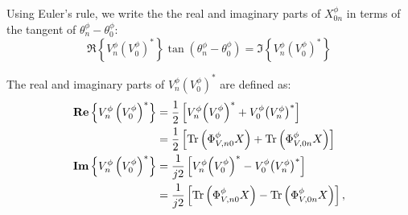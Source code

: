 
\noindent Using Euler's rule, we write the the real and imaginary parts of $X_{0n}^{\phi}$ in terms of the tangent of $\theta_{n}^{\phi} - \theta_{0}^{\phi}$:
\begin{equation}
	\Re \left\{ V_{n}^{\phi} {\left( V_{0}^{\phi} \right)}^{*} \right\} \tan \left( \theta_{n}^{\phi} - \theta_{0}^{\phi} \right)
    =
    \Im \left\{ V_{n}^{\phi} {\left( V_{0}^{\phi} \right)}^{*} \right\}
\end{equation}

\noindent The real and imaginary parts of $V_{n}^{\phi} \left( V_{0}^{\phi} \right)^{*}$ are defined as:
\begin{align}
	\operatorname{\textbf{Re}} \left\{ V_{n}^{\phi} \left( V_{0}^{\phi} \right)^{*} \right\}
    &= 
    \frac{1}{2} \left[ V_{n}^{\phi} {\left( V_{0}^{\phi} \right)}^{*} + V_{0}^{\phi} {\left( V_{n}^{\phi} \right)}^{*} \right] \nonumber \\
    &=
    \frac{1}{2} \left[ \operatorname{Tr} \left( \Phi_{V,n0}^{\phi} X \right) + \operatorname{Tr} \left( \Phi_{V,0n}^{\phi} X \right) \right] \\
    \operatorname{\textbf{Im}} \left\{ V_{n}^{\phi} \left( V_{0}^{\phi} \right)^{*} \right\}
    &=
    \frac{1}{j2} \left[ V_{n}^{\phi} {\left( V_{0}^{\phi} \right)}^{*} - V_{0}^{\phi} {\left( V_{n}^{\phi} \right)}^{*} \right] \nonumber \\
    &=
    \frac{1}{j2} \left[ \operatorname{Tr} \left( \Phi_{V,n0}^{\phi} X \right) - \operatorname{Tr} \left( \Phi_{V,0n}^{\phi} X \right) \right],
\end{align}

